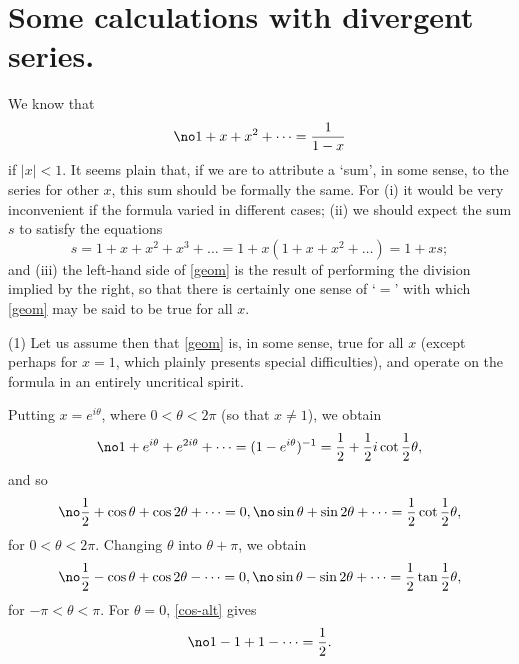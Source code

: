 \section{Some calculations with divergent series.} We know that
$$\no\label{geom} 1+x+x^2+\dots = \frac{1}{1-x}$$
if $|x|<1$. It seems plain that, if we are to attribute a `sum', in some
sense, to the series for other $x$, this sum should be formally the same.
For (i) it would be very inconvenient if the formula varied in different
cases; (ii) we should expect the sum $s$ to satisfy the equations
$$s = 1+x+x^2+x^3+\dots = 1+x(1+x+x^2+\dots) = 1+xs;$$
and (iii) the left-hand side of \eqref{geom} is the result of performing the
division implied by the right, so that there is certainly one sense of
`$=$' with which \eqref{geom} may be said to be true for all $x$.

(1) Let us assume then that \eqref{geom} is, in some sense, true for all $x$
(except perhaps for $x=1$, which plainly presents special difficulties), and
operate on the formula in an entirely uncritical spirit.

Putting $x=e^{i\theta}$, where $0<\theta<2\pi$ (so that $x\ne1$), we obtain
$$\no 1+e^{i\theta}+e^{2i\theta}+\dots = (1-e^{i\theta})^{-1} = \frac12+\frac12i\cot\frac12\theta,$$
and so
$$\no \frac12+\cos\theta+\cos2\theta+\dots = 0, \no\label{sin} \sin\theta+\sin2\theta+\dots = \frac12\cot\frac12\theta,$$
for $0<\theta<2\pi$. Changing $\theta$ into $\theta+\pi$, we obtain
$$\no\label{cos-alt} \frac12-\cos\theta+\cos2\theta-\dots = 0, \no\label{sin-alt} \sin\theta-\sin2\theta+\dots = \frac12\tan\frac12\theta,$$
for $-\pi<\theta<\pi$. For $\theta=0$, \eqref{cos-alt} gives
$$\no\label{grandi} 1-1+1-\dots = \frac12.$$

